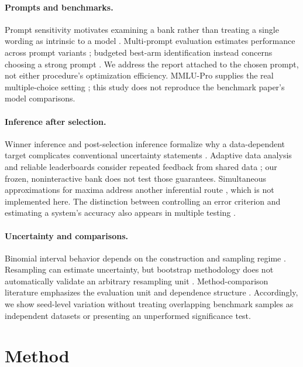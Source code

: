 \documentclass{article}
\begin{document}
\paragraph{Prompts and benchmarks.}
Prompt sensitivity motivates examining a bank rather than treating a single wording as intrinsic to a model \citep{Sclar2024Formatting}. Multi-prompt evaluation estimates performance across prompt variants \citep{Polo2024MultiPrompt}; budgeted best-arm identification instead concerns choosing a strong prompt \citep{Shi2024BestArm}. We address the report attached to the chosen prompt, not either procedure's optimization efficiency. MMLU-Pro supplies the real multiple-choice setting \citep{Wang2024MMLUPro}; this study does not reproduce the benchmark paper's model comparisons.

\paragraph{Inference after selection.}
Winner inference and post-selection inference formalize why a data-dependent target complicates conventional uncertainty statements \citep{Andrews2018Winners,Berk2013PostSelection}. Adaptive data analysis and reliable leaderboards consider repeated feedback from shared data \citep{Dwork2015Adaptive,Blum2015Ladder}; our frozen, noninteractive bank does not test those guarantees. Simultaneous approximations for maxima address another inferential route \citep{Chernozhukov2013Gaussian}, which is not implemented here. The distinction between controlling an error criterion and estimating a system's accuracy also appears in multiple testing \citep{Benjamini1995}.

\paragraph{Uncertainty and comparisons.}
Binomial interval behavior depends on the construction and sampling regime \citep{Brown2001Binomial}. Resampling can estimate uncertainty, but bootstrap methodology does not automatically validate an arbitrary resampling unit \citep{Efron1979Bootstrap,DiCiccio1996Bootstrap}. Method-comparison literature emphasizes the evaluation unit and dependence structure \citep{Dietterich1998Tests,Nadeau2003Inference,Demsar2006Comparisons}. Accordingly, we show seed-level variation without treating overlapping benchmark samples as independent datasets or presenting an unperformed significance test.

\section{Method}
\end{document}
